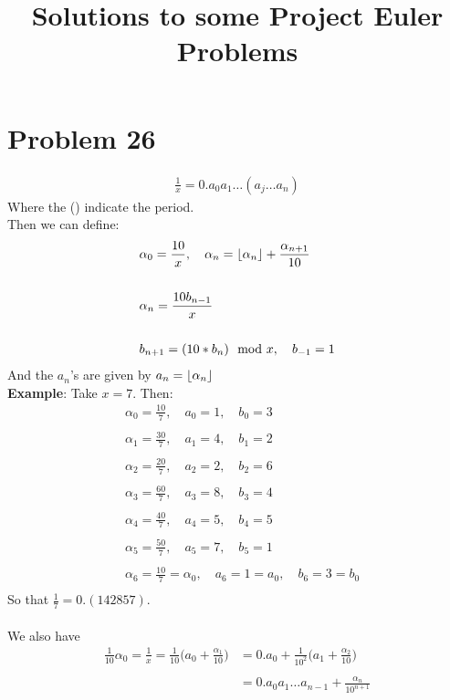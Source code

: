 \documentclass[12pt]{article}
\title{Solutions to some Project Euler Problems}
\date{}
\DeclarePairedDelimiter\floor{\lfloor}{\rfloor}
\begin{document}
\maketitle
\section*{Problem 26}
\begin{align*}
    \frac{1}{x} = 0.a_0a_1 \ldots (a_j \ldots a_n)
\end{align*}
Where the () indicate the period.\\
Then we can define:
\begin{align*}
    &\alpha_0 = \frac{10}{x},
    \quad \alpha_n = \floor{\alpha_n} + \frac{\alpha_{n+1}}{10} \\ \\
    &\alpha_n = \frac{10b_{n-1}}{x} \\ \\
    &b_{n+1} = (10*b_n) \mod x, \quad b_{-1} = 1
\end{align*}
And the $a_n$'s are given by $a_n = \floor{\alpha_n}$\\
\textbf{Example}:
Take $x = 7$. Then:
\begin{align*}
    &\alpha_0 = \frac{10}{7}, \quad a_0 = 1, \quad b_0 = 3\\\\
    &\alpha_1 = \frac{30}{7}, \quad a_1 = 4, \quad b_1 = 2\\\\
    &\alpha_2 = \frac{20}{7}, \quad a_2 = 2, \quad b_2 = 6\\\\
    &\alpha_3 = \frac{60}{7}, \quad a_3 = 8, \quad b_3 = 4\\\\
    &\alpha_4 = \frac{40}{7}, \quad a_4 = 5, \quad b_4 = 5\\\\
    &\alpha_5 = \frac{50}{7}, \quad a_5 = 7, \quad b_5 = 1\\\\
    &\alpha_6 = \frac{10}{7}=\alpha_0, \quad a_6 = 1=a_0, \quad b_6 = 3=b_0\\
\end{align*}
So that $\frac{1}{7} =  0.(142857)$.\\\\
We also have
\begin{align*}
    \frac{1}{10}\alpha_0 = \frac{1}{x} = \frac{1}{10} \bigg(a_0+\frac{\alpha_1}{10} \bigg) &= 0.a_0 + \frac{1}{10^2} \bigg(a_1 + \frac{\alpha_2}{10} \bigg) \\\\
    &= 0.a_0a_1\ldots a_{n-1} + \frac{\alpha_n}{10^{n+1}}
\end{align*}
\end{document}
